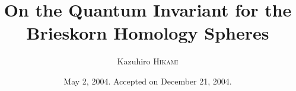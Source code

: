 \documentclass[12pt,reqno]{amsart}
\numberwithin{equation}{section}
\begin{document}
\renewcommand{\thefootnote}{\fnsymbol{footnote}}
\baselineskip 17pt
\parskip 7pt
\sloppy









\title{On the Quantum  Invariant for the Brieskorn Homology Spheres}



    \author{Kazuhiro \textsc{Hikami}}




  \address{Department of Physics, Graduate School of Science,
    University of Tokyo,
    Hongo 7--3--1, Bunkyo, Tokyo 113--0033,   Japan.
    }
    












\date{May 2, 2004. Accepted on  December 21, 2004.}
\end{document}
